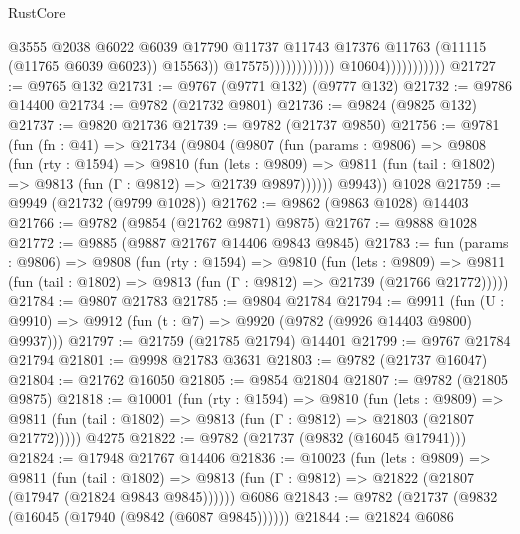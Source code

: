 \begin{lexlean}{RustCore}
\begin{coremodule}
                                                      @3555
                                                      @2038
                                                      @6022
                                                      @6039
                                                      @17790
                                                      @11737
                                                      @11743
                                                      @17376
                                                      @11763
                                                      (@11115 (@11765 @6039 @6023))
                                                      @15563))
                                                  @17575))))))))))))
                          @10604)))))))))))
@21727 := @9765 @132
@21731 := @9767 (@9771 @132) (@9777 @132)
@21732 := @9786 @14400
@21734 := @9782 (@21732 @9801)
@21736 := @9824 (@9825 @132)
@21737 := @9820 @21736
@21739 := @9782 (@21737 @9850)
@21756 := @9781
    (fun (fn : @41) =>
    @21734
      (@9804
        (@9807
          (fun (params : @9806) =>
          @9808
            (fun (rty : @1594) =>
            @9810
              (fun (lets : @9809) =>
              @9811 (fun (tail : @1802) => @9813 (fun (Γ : @9812) => @21739 @9897))))))
        @9943))
    @1028
@21759 := @9949 (@21732 (@9799 @1028))
@21762 := @9862 (@9863 @1028) @14403
@21766 := @9782 (@9854 (@21762 @9871) @9875)
@21767 := @9888 @1028
@21772 := @9885 (@9887 @21767 @14406 @9843 @9845)
@21783 := fun (params : @9806) =>
  @9808
    (fun (rty : @1594) =>
    @9810
      (fun (lets : @9809) =>
      @9811 (fun (tail : @1802) => @9813 (fun (Γ : @9812) => @21739 (@21766 @21772)))))
@21784 := @9807 @21783
@21785 := @9804 @21784
@21794 := @9911
    (fun (U : @9910) => @9912 (fun (t : @7) => @9920 (@9782 (@9926 @14403 @9800) @9937)))
@21797 := @21759 (@21785 @21794) @14401
@21799 := @9767 @21784 @21794
@21801 := @9998 @21783 @3631
@21803 := @9782 (@21737 @16047)
@21804 := @21762 @16050
@21805 := @9854 @21804
@21807 := @9782 (@21805 @9875)
@21818 := @10001
    (fun (rty : @1594) =>
    @9810
      (fun (lets : @9809) =>
      @9811 (fun (tail : @1802) => @9813 (fun (Γ : @9812) => @21803 (@21807 @21772)))))
    @4275
@21822 := @9782 (@21737 (@9832 (@16045 @17941)))
@21824 := @17948 @21767 @14406
@21836 := @10023
    (fun (lets : @9809) =>
    @9811
      (fun (tail : @1802) =>
      @9813 (fun (Γ : @9812) => @21822 (@21807 (@17947 (@21824 @9843 @9845))))))
    @6086
@21843 := @9782 (@21737 (@9832 (@16045 (@17940 (@9842 (@6087 @9845))))))
@21844 := @21824 @6086

\end{coremodule}
\end{lexlean}
